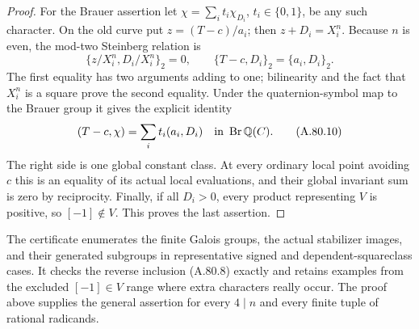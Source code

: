 \begin{proof}
For the Brauer assertion let
$\chi=\sum_i t_i\chi_{D_i}$, $t_i\in\{0,1\}$, be any
such character.  On the old curve put
$z=(T-c)/a_i$; then $z+D_i=X_i^n$.
Because $n$ is even, the mod-two Steinberg relation is
\[
 \{z/X_i^n,D_i/X_i^n\}_2=0,
       \qquad
 \{T-c,D_i\}_2=\{a_i,D_i\}_2.
 \tag{A.80.9}
\]
The first equality has two arguments adding to one; bilinearity
and the fact that $X_i^n$ is a square prove the second equality.
Under the quaternion-symbol map to the Brauer group it gives
the explicit identity
\[
          (T-c,\chi)=\sum_i t_i(a_i,D_i)
                             \quad\text{in }\operatorname{Br}\mathbb Q(C).
 \tag{A.80.10}
\]
The right side is one global constant class.  At every ordinary
local point avoiding $c$ this is an equality of its actual local
evaluations, and their global invariant sum is zero by reciprocity.
Finally, if all $D_i>0$, every product representing $V$ is
positive, so $[-1]\notin V$.  This proves the last assertion.
\end{proof}

The certificate 
enumerates the finite Galois groups, the actual stabilizer images,
and their generated subgroups in representative signed and
dependent-squareclass cases.  It checks the reverse inclusion
(A.80.8) exactly and retains examples from the excluded
$[-1]\in V$ range where extra characters really occur.
The proof above supplies the general assertion for every
$4\mid n$ and every finite tuple of rational radicands.
